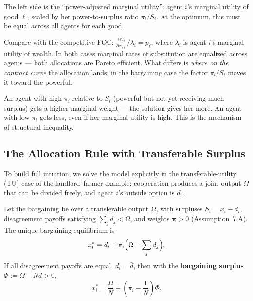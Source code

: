 \documentclass[../structural_economics_book.tex]{subfiles}
\begin{document}
\begin{intuition}
The left side is the ``power-adjusted marginal utility'': agent $i$'s marginal utility of good $\ell$, scaled by her power-to-surplus ratio $\pi_i / S_i$. At the optimum, this must be equal across all agents for each good.

Compare with the competitive FOC: $\frac{\partial U_i}{\partial x_{i\ell}} / \lambda_i = p_\ell$, where $\lambda_i$ is agent $i$'s marginal utility of wealth. In both cases marginal rates of substitution are equalized across agents --- both allocations are Pareto efficient. What differs is \textit{where on the contract curve} the allocation lands: in the bargaining case the factor $\pi_i / S_i$ moves it toward the powerful.

An agent with high $\pi_i$ relative to $S_i$ (powerful but not yet receiving much surplus) gets a higher marginal weight --- the solution gives her more. An agent with low $\pi_i$ gets less, even if her marginal utility is high. This is the mechanism of structural inequality.
\end{intuition}


\subsection{The Allocation Rule with Transferable Surplus}

To build full intuition, we solve the model explicitly in the transferable-utility (TU) case of the landlord--farmer example: cooperation produces a joint output $\Omega$ that can be divided freely, and agent $i$'s outside option is $d_i$.

\begin{proposition}\label{ch07:prop:allocation-rule}
Let the bargaining be over a transferable output $\Omega$, with surpluses $S_i = x_i - d_i$, disagreement payoffs satisfying $\sum_j d_j < \Omega$, and weights $\boldsymbol{\pi} > 0$ (Assumption~7.A). The unique bargaining equilibrium is
\begin{equation}\label{ch07:eq:LQ_solution}
x_i^* = d_i + \pi_i \Bigl(\Omega - \sum_{j} d_j\Bigr).
\end{equation}
If all disagreement payoffs are equal, $d_i = \bar{d}$, then with the \textbf{bargaining surplus} $\Phi := \Omega - N\bar{d} > 0$,
\begin{equation}\label{ch07:eq:LQ_equal_omega}
x_i^* = \frac{\Omega}{N} + \left(\pi_i - \frac{1}{N}\right) \Phi .
\end{equation}
\end{proposition}
\end{document}
